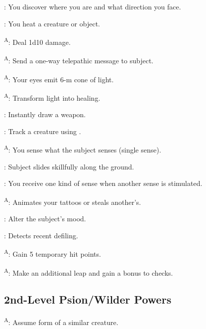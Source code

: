 : You discover where you are and what direction you face.

: You heat a creature or object.

\textsuperscript{A}: Deal 1d10 damage.

\textsuperscript{A}: Send a one-way telepathic message to subject.

\textsuperscript{A}: Your eyes emit 6-m cone of light.

\textsuperscript{A}: Transform light into healing.

: Instantly draw a weapon.

: Track a creature using .

\textsuperscript{A}: You sense what the subject senses (single sense).

: Subject slides skillfully along the ground.

: You receive one kind of sense when another sense is stimulated.

\textsuperscript{A}: Animates your tattoos or steals another's.

: Alter the subject's mood.

: Detects recent defiling.

\textsuperscript{A}: Gain 5 temporary hit points.

\textsuperscript{A}: Make an additional leap and gain a bonus to  checks.




\subsection{2nd-Level Psion/Wilder Powers}

\textsuperscript{A}: Assume form of a similar creature.

